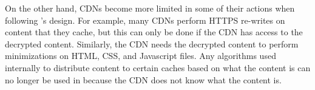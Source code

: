 On the other hand, CDNs become more limited in some of their actions when following \system{}'s design.  For example, 
many CDNs perform HTTPS re-writes on content that they cache, but this can only be done if the CDN has access to the 
decrypted content.  Similarly, the CDN needs the decrypted content to perform minimizations on HTML, CSS, and Javascript 
files.  Any algorithms used internally to distribute content to certain caches based on what the content is can no longer 
be used in \system{} because the CDN does not know what the content is. 
